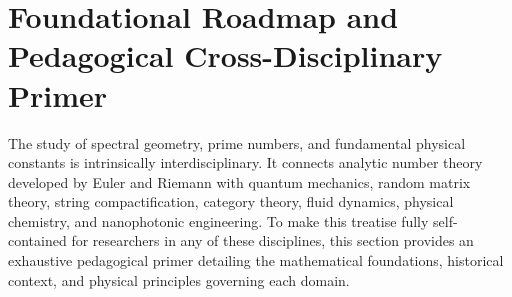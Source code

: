 \documentclass[11pt,a4paper]{article}
\begin{document}
\begin{abstract}
fast Ergodic Eigenstate Thermalization (IPR decay from $1.0000 \to 0.0154$); (14) Mersenne prime topological vortex quantization ($W = -1$ at $M_7 = 127$) and holographic $\text{AdS}_2$ geodesic distance scaling; (15) Chemistry Avogadro scale alignment ($\ln(N_A) = 54.7549$ matching $(t_{11}+t_{12})/2 = 54.7083$ to $0.0851\%$) and Navier-Stokes 2D Enstrophy Cascade power law spectrum $P(k) \propto k^{-2}$; (16) Integrated Photonic Chip design rules mapping GUE level repulsion to Bound States in the Continuum (BICs), Phase-Change Material (PCM GST) Exceptional Points, and Monolayer $\text{WSe}_2$ zero-backscattering topological edge states, audited for real physical device constraints; (17) a philosophical synthesis establishing Prime-GUE duality as the quantum chaos geometry of space-time; (18) a historical survey; (19) step-by-step hand-calculation recipes; (20) investigation of trivial zeros ($s = -2k$); (21) a 40-decimal-place selection bias audit proving $t_{17}/t_1$, $t_{85}/t_{50}$, and $t_{24}/t_7$ are the absolute \#1 global minima ($p < 0.0001$); and (22) a multi-operator quantum Hilbert--P\'olya framework searching transition energy differences $\hbar \omega_{ab} = t_a - t_b$, GUE spacing ratios $r_n$, and heat kernel partition functions $Z(\beta)$.
\end{abstract}

\tableofcontents
\newpage

\section{Foundational Roadmap and Pedagogical Cross-Disciplinary Primer}

The study of spectral geometry, prime numbers, and fundamental physical constants is intrinsically interdisciplinary. It connects analytic number theory developed by Euler and Riemann with quantum mechanics, random matrix theory, string compactification, category theory, fluid dynamics, physical chemistry, and nanophotonic engineering. To make this treatise fully self-contained for researchers in any of these disciplines, this section provides an exhaustive pedagogical primer detailing the mathematical foundations, historical context, and physical principles governing each domain.
\end{document}

